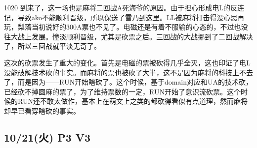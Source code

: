 
1020 到来了，这一场也是麻将二回战A死海爷的原因。由于担心形成电L的反连记，导致ako不能顺利晋级，所以保送了雪乃到这里。LL被麻将打击得没心思再玩，梨落当初说好的300A票也不见了。电磁还是有着不服输的心态的，不过也没往大战上发展。憧淡顺利晋级，尤其是砍票之后。三回战的大战挪到了二回战解决了，所以三回战就平淡无奇了。

这次的砍票发生了重大的变化。首先是电磁的票被砍得几乎全灭，这也印证了电L没能破解技术砍的事实。而麻将的票也被砍了大半，这不是因为麻将的科技上不去了，而是因为——RUN开始瞎砍了。这个时候，基于domain对应和UA的技术砍，已经砍不掉圆麻的票了，为了维持票数的一定，RUN开始了意识流砍票。这个时候的RUN还不敢太做作，基本上在萌文上之类的都砍得看似有点道理，然而麻将却早已看穿瞎砍的事实。

\subsection{10/21(火) P3 V3}

